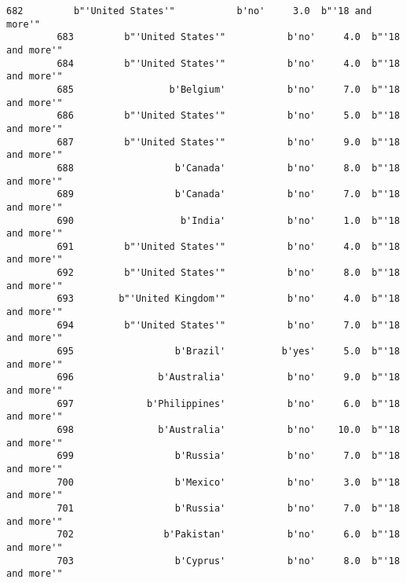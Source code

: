 \documentclass[11pt]{article}
\begin{document}
\begin{Verbatim}[commandchars=\\\{\}]
         682         b"'United States'"           b'no'     3.0  b"'18 and more'"   
         683         b"'United States'"           b'no'     4.0  b"'18 and more'"   
         684         b"'United States'"           b'no'     4.0  b"'18 and more'"   
         685                 b'Belgium'           b'no'     7.0  b"'18 and more'"   
         686         b"'United States'"           b'no'     5.0  b"'18 and more'"   
         687         b"'United States'"           b'no'     9.0  b"'18 and more'"   
         688                  b'Canada'           b'no'     8.0  b"'18 and more'"   
         689                  b'Canada'           b'no'     7.0  b"'18 and more'"   
         690                   b'India'           b'no'     1.0  b"'18 and more'"   
         691         b"'United States'"           b'no'     4.0  b"'18 and more'"   
         692         b"'United States'"           b'no'     8.0  b"'18 and more'"   
         693        b"'United Kingdom'"           b'no'     4.0  b"'18 and more'"   
         694         b"'United States'"           b'no'     7.0  b"'18 and more'"   
         695                  b'Brazil'          b'yes'     5.0  b"'18 and more'"   
         696               b'Australia'           b'no'     9.0  b"'18 and more'"   
         697             b'Philippines'           b'no'     6.0  b"'18 and more'"   
         698               b'Australia'           b'no'    10.0  b"'18 and more'"   
         699                  b'Russia'           b'no'     7.0  b"'18 and more'"   
         700                  b'Mexico'           b'no'     3.0  b"'18 and more'"   
         701                  b'Russia'           b'no'     7.0  b"'18 and more'"   
         702                b'Pakistan'           b'no'     6.0  b"'18 and more'"   
         703                  b'Cyprus'           b'no'     8.0  b"'18 and more'"   
         

\end{Verbatim}
\end{document}
